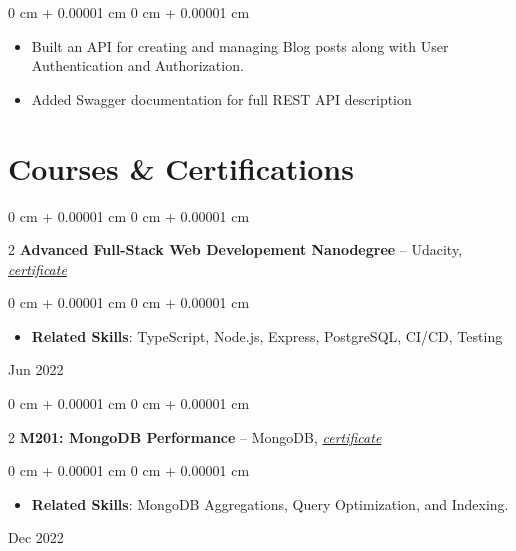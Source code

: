 \documentclass[10pt, letterpaper]{article}
\newenvironment{highlights}{
    \begin{itemize}[
        topsep=0.10 cm,
        parsep=0.10 cm,
        partopsep=0pt,
        itemsep=1pt,
        leftmargin=0 cm + 12pt
    ]
}{
    \end{itemize}
} %
\newenvironment{onecolentry}{
    \begin{adjustwidth}{
        0 cm + 0.00001 cm
    }{
        0 cm + 0.00001 cm
    }
}{
    \end{adjustwidth}
} %
\newenvironment{twocolentry}[2][]{
    \onecolentry
    \def\secondColumn{#2}
    \setcolumnwidth{\fill, 4.5 cm}
    \begin{paracol}{2}
}{
    \switchcolumn \raggedleft \secondColumn
    \end{paracol}
    \endonecolentry
} %
\begin{document}
        \vspace{0.10 cm}
        \begin{onecolentry}
            \begin{highlights}
                \item Built an API for creating and managing Blog posts along with User Authentication and Authorization.
                \item Added Swagger documentation for full REST API description
            \end{highlights}
        \end{onecolentry}


    \section{Courses \& Certifications}
    \begin{twocolentry} {
        Jun 2022
    } \textbf{Advanced Full-Stack Web Developement Nanodegree} -- Udacity, \href{https://www.udacity.com/certificate/FSGKYGKA}{\textit{certificate}}
    \begin{onecolentry}
        \begin{highlights}
            \item \textbf{Related Skills}: TypeScript, Node.js, Express, PostgreSQL, CI/CD, Testing
        \end{highlights}
    \end{onecolentry}
        
    \end{twocolentry}
    
    \vspace{0.1 cm}

    \begin{twocolentry} {
        Dec 2022
    } \textbf{M201: MongoDB Performance} -- MongoDB, \href{https://learn.mongodb.com/c/8m8_F0jdSJmwhVaylvIzEA}{\textit{certificate}}
    \begin{onecolentry}
        \begin{highlights}
            \item \textbf{Related Skills}: MongoDB Aggregations, Query Optimization, and Indexing.
        \end{highlights}
    \end{onecolentry}
        
    \end{twocolentry}
\vspace{0.1 cm}
\end{document}
